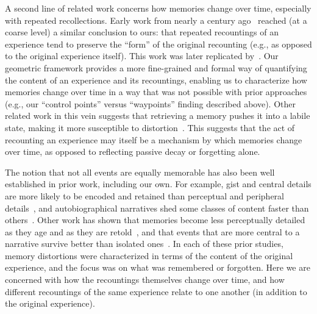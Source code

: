 \documentclass[10pt]{article}
\begin{document}
A second line of related work concerns how memories change over time, especially with repeated recollections.
Early work from nearly a century ago~\citep{Bart32} reached (at a coarse level) a similar conclusion to ours: that repeated recountings of an experience tend to preserve the ``form'' of the original recounting (e.g., as opposed to the original experience itself).
This work was later replicated by~\cite{BergRoed99}.
Our geometric framework provides a more fine-grained and formal way of quantifying the content of an experience and its recountings, enabling us to characterize how memories change over time in a way that was not possible with prior approaches (e.g., our ``control points'' versus ``waypoints'' finding described above).
Other related work in this vein suggests that retrieving a memory pushes it into a labile state, making it more susceptible to distortion~\citep{NadeEtal00,HupbEtal07,NadeHard09,BridPall12,StJaScha13,ChanEtal09b}.
This suggests that the act of recounting an experience may itself be a mechanism by which memories change over time, as opposed to reflecting passive decay or forgetting alone.

The notion that not all events are equally memorable has also been well established in prior work, including our own.
For example, gist and central details are more likely to be encoded and retained than perceptual and peripheral details~\citep{HeusEtal21,SekeEtal16,SekeEtal18,GilbMosc21}, and autobiographical narratives shed some classes of content faster than others~\citep{DiamLevi20,SuEtal26}.
Other work has shown that memories become less perceptually detailed as they age and as they are retold~\citep{LifaEtal21}, and that events that are more central to a narrative survive better than isolated ones~\citep{LeeChen22,AntoEtal24}.
In each of these prior studies, memory distortions were characterized in terms of the content of the original experience, and the focus was on what was remembered or forgotten.
Here we are concerned with how the recountings themselves change over time, and how different recountings of the same experience relate to one another (in addition to the original experience).
\end{document}

